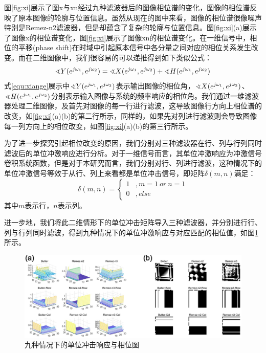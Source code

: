 \documentclass{article}
\begin{document}
图\ref{fig:xi}展示了图x与xn经过九种滤波器后的图像相位谱的变化，图像的相位谱反映了原本图像的轮廓与位置信息。虽然从现在的图中来看，图像的相位谱很像噪声特别是Remez-n2滤波器，但是却蕴含了复杂的轮廓与位置信息。图\ref{fig:xi}(a)展示了图像x的相位谱变化，图\ref{fig:xi}展示了图像xn的相位谱变化。在一维信号中，相位的平移(phase shift)在时域中引起原本信号中各分量之间对应的相位关系发生改变。而在二维图像中，我们很容易的可以递推得到如下类似公式：
\begin{equation}
\label{equ:xiange}
\varangle Y(e^{j\omega_1}, e^{j\omega_2})=\varangle X(e^{j\omega_1}, e^{j\omega_2}) + \varangle H(e^{j\omega_1}, e^{j\omega_2})
\end{equation}
式\ref{equ:xiange}展示中$\varangle Y(e^{j\omega_1}, e^{j\omega_2})$表示输出图像的相位角，$\varangle X(e^{j\omega_1}, e^{j\omega_2})$、$\varangle H(e^{j\omega_1}, e^{j\omega_2})$分别表示输入图像与系统的频率响应的相位角。我们通过一维滤波器处理二维图像，及首先对图像的每一行进行滤波，这导致图像行方向上相位谱的改变，如\ref{fig:xi}(a)(b)的第二行所示，同样的，如果先对列进行滤波则会导致图像每一列方向上的相位改变，如图\ref{fig:xi}(a)(b)的第三行所示。

为了进一步探究引起相位改变的原因，我们分别对三种滤波器在行、列与行列同时滤波后的单位冲激响应进行分析。对于一维信号而言，其单位冲激响应为冲激信号卷积系统函数，但是对于本研究而言，我们分别对行、列进行滤波，这种情况下的单位冲激信号等效于从行、列上来看都是单位冲击信号，即矩阵$\delta(m,n)$满足：
\begin{equation}
    \delta(m,n)=\left\{
\begin{aligned}
1& ,m=1\ or \ n=1\\
0& ,else
\end{aligned}
\right.
\end{equation}
其中$m$表示行，$n$表示列。

进一步地，我们将此二维情形下的单位冲击矩阵导入三种滤波器，并分别进行行、列与行列同时滤波，得到九种情况下的单位冲激响应与对应匹配的相位值，如图\ref{fig:5pp}所示。
\begin{figure}[h]
    \centering
    \includegraphics[width=14cm]{5pp.eps}
    \caption{九种情况下的单位冲击响应与相位图}
    \label{fig:5pp}
\end{figure}
\end{document}
